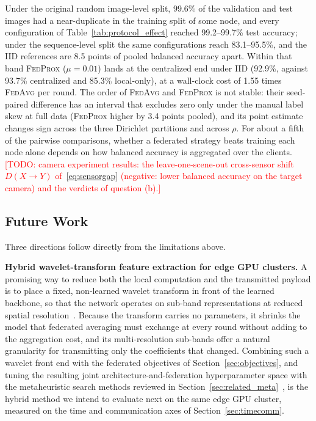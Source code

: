 \documentclass[journal]{IEEEtran}
\newcommand{\fedavg}{\textsc{FedAvg}}
\newcommand{\fedprox}{\textsc{FedProx}}
\newcommand{\todo}[1]{\textcolor{red}{[TODO: #1]}}
\begin{document}
Under the original random image-level split, 99.6\% of the validation and test images had a near-duplicate in the training split of some node, and every configuration of Table~\ref{tab:protocol_effect} reached 99.2--99.7\% test accuracy; under the sequence-level split the same configurations reach 83.1--95.5\%, and the IID references are 8.5 points of pooled balanced accuracy apart. Within that band \fedprox{} ($\mu=0.01$) lands at the centralized end under IID (92.9\%, against 93.7\% centralized and 85.3\% local-only), at a wall-clock cost of 1.55 times \fedavg{} per round. The order of \fedavg{} and \fedprox{} is not stable: their seed-paired difference has an interval that excludes zero only under the manual label skew at full data (\fedprox{} higher by 3.4 points pooled), and its point estimate changes sign across the three Dirichlet partitions and across $\rho$. For about a fifth of the pairwise comparisons, whether a federated strategy beats training each node alone depends on how balanced accuracy is aggregated over the clients. \todo{camera experiment results: the leave-one-scene-out cross-sensor shift $D(X\rightarrow Y)$ of~\eqref{eq:sensorgap} (negative: lower balanced accuracy on the target camera) and the verdicts of question (b).}

\subsection{Future Work}
\label{sec:future}

Three directions follow directly from the limitations above.

\textbf{Hybrid wavelet-transform feature extraction for edge GPU clusters.} A promising way to reduce both the local computation and the transmitted payload is to place a fixed, non-learned wavelet transform in front of the learned backbone, so that the network operates on sub-band representations at reduced spatial resolution~\cite{dede2025wavelet, yang2025wavelitenet}. Because the transform carries no parameters, it shrinks the model that federated averaging must exchange at every round without adding to the aggregation cost, and its multi-resolution sub-bands offer a natural granularity for transmitting only the coefficients that changed. Combining such a wavelet front end with the federated objectives of Section~\ref{sec:objectives}, and tuning the resulting joint architecture-and-federation hyperparameter space with the metaheuristic search methods reviewed in Section~\ref{sec:related_meta}~\cite{tuba2021cnnhyper, ibrahim2025metaheuristiccnn}, is the hybrid method we intend to evaluate next on the same edge GPU cluster, measured on the time and communication axes of Section~\ref{sec:timecomm}.
\end{document}

